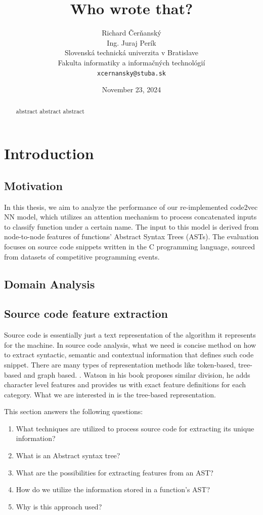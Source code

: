 \documentclass[10pt,english,a4paper]{report}
\title{Who wrote that?}
\author{Richard Čerňanský\\ Ing. Juraj Perík\\
{\small Slovenská technická univerzita v Bratislave}\\
{\small Fakulta informatiky a informačných technológií}\\
{\small \texttt{xcernansky@stuba.sk}}\\
}
\date{\small November 23, 2024}
\begin{document}
\maketitle

\begin{abstract}
abstract abstract abstract

\end{abstract}

\chapter{Introduction}

\section{Motivation}

In this thesis, we aim to analyze the performance of our re-implemented code2vec NN model, which utilizes an attention mechanism to process concatenated inputs to classify function under a certain name. The input to this model is derived from node-to-node features of functions' Abstract Syntax Trees (ASTs). The evaluation focuses on source code snippets written in the C programming language, sourced from datasets of competitive programming events.

\section{Domain Analysis}

\section{Source code feature extraction}
Source code is essentially just a text representation of the algorithm it
represents for the machine. In source code analysis, what we need is
concise method on how to extract syntactic, semantic and contextual information that defines such code snippet. There are many types of representation methods like token-based, tree-based and graph based.
\cite{samoaa}. Watson in his book \cite{DanielWatson} proposes similar division, he adds character level features and provides us with exact feature definitions for each category.  What we are interested in is the tree-based representation.

This section answers the following questions:

\begin{enumerate}
    \item What techniques are utilized to process source code for extracting its unique information?
    \item What is an Abstract syntax tree?
    \item What are the possibilities for extracting features from an AST?
    \item How do we utilize the information stored in a function's AST?
    \item Why is this approach used?
\end{enumerate}
\end{document}
